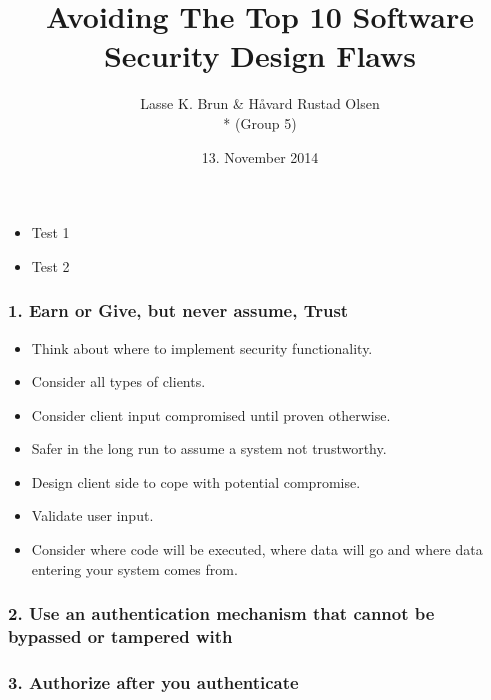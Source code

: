 \documentclass[12pt,norsk]{beamer}
\title[Avoiding The Top 10 Software Security Design Flaws]{Avoiding The Top 10 Software Security Design Flaws}
\author{Lasse K. Brun \& Håvard Rustad Olsen \\* (Group 5)} %
\institute[UiB]
{
\medskip
\textit{lkbrun@gmail.com \& haavard.olsen@live.com} \\* %
\textit{INF226 - Software Security, Fall 2014 }
}
\date{13. November 2014} %
\begin{document}
 

\begin{frame}
\titlepage %
\end{frame}


\begin{frame}
	\begin{itemize}
		\item Test 1
		\item Test 2
	\end{itemize}		

\end{frame}

\begin{frame}

	\frametitle{1. Earn or Give, but never assume, Trust}
	
	\begin{itemize}
		\item Think about where to implement security functionality. 
		\item Consider all types of clients.
		\item Consider client input compromised until proven otherwise.
		\item Safer in the long run to assume a system not trustworthy.
		\item Design client side to cope with potential compromise.
		\item Validate user input.
		\item Consider where code will be executed, where data will go and where data entering your system comes from. 
	\end{itemize}

\end{frame}

\begin{frame}

	\frametitle{2. Use an authentication mechanism that cannot be bypassed or tampered with}
	

\end{frame}

\begin{frame}

	\frametitle{3. Authorize after you authenticate}
	

\end{frame}
\end{document}
